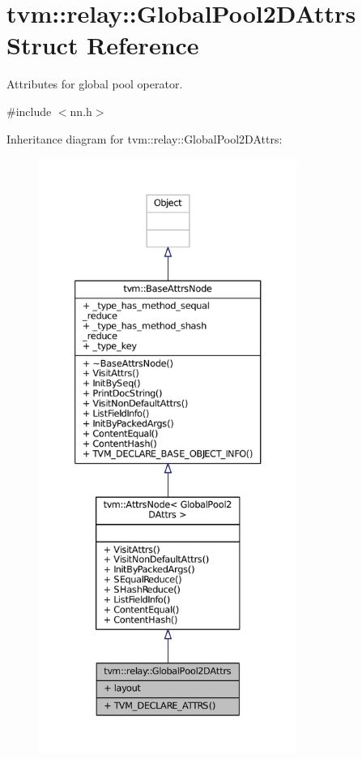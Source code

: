 \hypertarget{structtvm_1_1relay_1_1GlobalPool2DAttrs}{}\section{tvm\+:\+:relay\+:\+:Global\+Pool2\+D\+Attrs Struct Reference}
\label{structtvm_1_1relay_1_1GlobalPool2DAttrs}


Attributes for global pool operator.  




{\ttfamily \#include $<$nn.\+h$>$}



Inheritance diagram for tvm\+:\+:relay\+:\+:Global\+Pool2\+D\+Attrs\+:
\nopagebreak
\begin{figure}[H]
\begin{center}
\leavevmode
\includegraphics[height=550pt]{structtvm_1_1relay_1_1GlobalPool2DAttrs__inherit__graph}
\end{center}
\end{figure}


